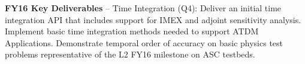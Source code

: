 \textbf{FY16 Key Deliverables} -- Time Integration (Q4): Deliver an
initial time integration API that includes support for IMEX and adjoint
sensitivity analysis. Implement basic time integration methods needed
to support ATDM Applications. Demonstrate temporal order of accuracy
on basic physics test problems representative of the L2 FY16 milestone
on ASC testbeds.
